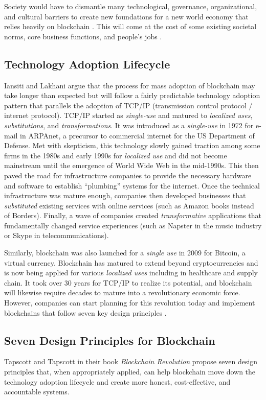 \documentclass[sigconf]{acmart}
\begin{document}
Society would have to dismantle many technological, governance, organizational, and cultural barriers to create new foundations for a new world economy that relies heavily on blockchain \cite{hbr}. This will come at the cost of some existing societal norms, core business functions, and people's jobs \cite{hbr} \cite{rabah2017overview}. 

\subsection{Technology Adoption Lifecycle}
Iansiti and Lakhani \cite{hbr} argue that the process for mass adoption of blockchain may take longer than expected but will follow a fairly predictable technology adoption pattern that parallels the adoption of TCP/IP (transmission control protocol / internet protocol). TCP/IP started as \textit{single-use} and matured to \textit{localized uses}, \textit{substitutions}, and \textit{transformations}. It was introduced as a \textit{single-use} in 1972 for e-mail in ARPAnet, a precursor to commercial internet for the US Department of Defense. Met with skepticism, this technology slowly gained traction among some firms in the 1980s and early 1990s for \textit{localized use} and did not become mainstream until the emergence of World Wide Web in the mid-1990s. This then paved the road for infrastructure companies to provide the necessary hardware and software to establish ``plumbing'' systems for the internet. Once the technical infrastructure was mature enough, companies then developed businesses that \textit{substituted} existing services with online services (such as Amazon books instead of Borders). Finally, a wave of companies created \textit{transformative} applications that fundamentally changed service experiences (such as Napster in the music industry or Skype in telecommunications).

Similarly, blockchain was also launched for a \textit{single use} in 2009 for Bitcoin, a virtual currency. Blockchain has matured to extend beyond cryptocurrencies and is now being applied for various \textit{localized uses} including in healthcare and supply chain. It took over 30 years for TCP/IP to realize its potential, and blockchain will likewise require decades to mature into a revolutionary economic force. However, companies can start planning for this revolution today and implement blockchains that follow seven key design principles \cite{hbr} \cite{tapscott}.

\subsection{Seven Design Principles for Blockchain}
Tapscott and Tapscott \cite{tapscott} in their book \textit{Blockchain Revolution} propose seven design principles that, when appropriately applied, can help blockchain move down the technology adoption lifecycle and create more honest, cost-effective, and accountable systems.
\end{document}
